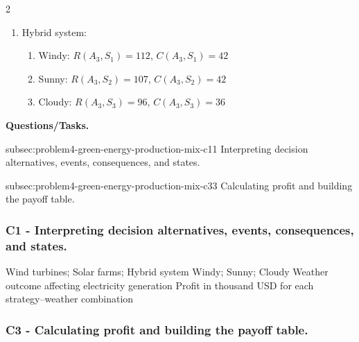 \begin{multicols}{2}
\begin{enumerate}[label=\arabic*.]
\begin{enumerate}[label=\roman*)]
			\item Sunny:
			\(R(A_2,S_2)=143\), \(C(A_2,S_2)=48\)
			
			\item Cloudy:
			\(R(A_2,S_3)=63\), \(C(A_2,S_3)=38\)
		\end{enumerate}
		
		\item Hybrid system:
		\begin{enumerate}[label=\roman*)]
			\item Windy:
			\(R(A_3,S_1)=112\), \(C(A_3,S_1)=42\)
			
			\item Sunny:
			\(R(A_3,S_2)=107\), \(C(A_3,S_2)=42\)
			
			\item Cloudy:
			\(R(A_3,S_3)=96\), \(C(A_3,S_3)=36\)
		\end{enumerate}
	\end{enumerate}
\end{multicols}

\textbf{Questions/Tasks.}
\begin{enumerate}
	\CriterionTask
	{subsec:problem4-green-energy-production-mix-c1}{1}
	{Interpreting decision alternatives, events, consequences, and states.}

	\CriterionTask
	{subsec:problem4-green-energy-production-mix-c3}{3}
	{Calculating profit and building the payoff table.}
\end{enumerate}

\subsubsection*{C1 - Interpreting decision alternatives, events, consequences, and states.}
\label{subsec:problem4-green-energy-production-mix-c1}

\DecisionElementsTable
{Wind turbines; Solar farms; Hybrid system}
{Windy; Sunny; Cloudy}
{Weather outcome affecting electricity generation}
{Profit in thousand USD for each strategy--weather combination}


\subsubsection*{C3 - Calculating profit and building the payoff table.}
\label{subsec:problem4-green-energy-production-mix-c3}

